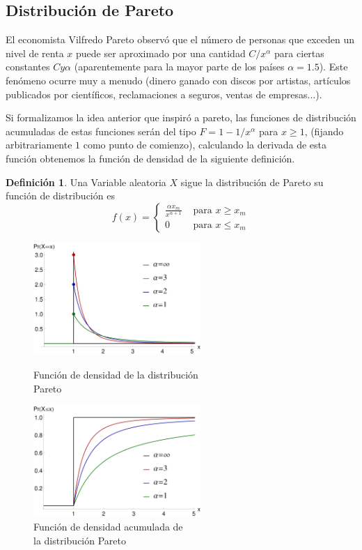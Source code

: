 \documentclass[]{book}
\theoremstyle{plain}
\theoremstyle{definition}
\newtheorem{definition}[theorem]{Definición}
\theoremstyle{definition} %
\begin{document}
\subsection{Distribución de Pareto}

El economista Vilfredo Pareto observó que el número de personas que exceden un nivel de renta 
$x$ puede ser aproximado por una cantidad $C/x^\alpha$ para ciertas constantes $C y \alpha$ (aparentemente para la mayor parte 
de los países $\alpha = 1.5$). Este fenómeno ocurre muy a menudo (dinero ganado con discos por artistas, artículos publicados por 
científicos, reclamaciones a seguros, ventas de empresas...).

Si formalizamos la idea anterior que inspiró a pareto, las funciones de distribución acumuladas de estas funciones 
serán del tipo $F = 1 - 1/x^\alpha$ para $x\geq 1$, (fijando arbitrariamente $1$ como punto de comienzo), calculando la derivada 
de esta función obtenemos la función de densidad de la siguiente definición.

\begin{definition}
Una Variable aleatoria $X$ sigue la distribución de Pareto su función de distribución es 
\[
f(x) = \begin{cases}
  \frac{\alpha x_m}{x^{\alpha+1}} & \text{ para } x\geq x_m\\
  0 & \text{ para } x\leq x_m
\end{cases}  
\]
\end{definition}




\begin{figure}[htbp]
  \begin{minipage}{0.5\linewidth}
  \centering
  \includegraphics[width=2.5in,height=\textheight]{img/pareto_1.svg.png}
  \caption{Función de densidad de la distribución\\ Pareto}
  \end{minipage}%
  \begin{minipage}{0.5\linewidth}
  \centering
  \includegraphics[width=2.5in,height=\textheight]{img/pareto_2.svg.png}
  \caption{Función de densidad acumulada de \\la distribución Pareto}
  \end{minipage}
\end{figure} 
\end{document}
